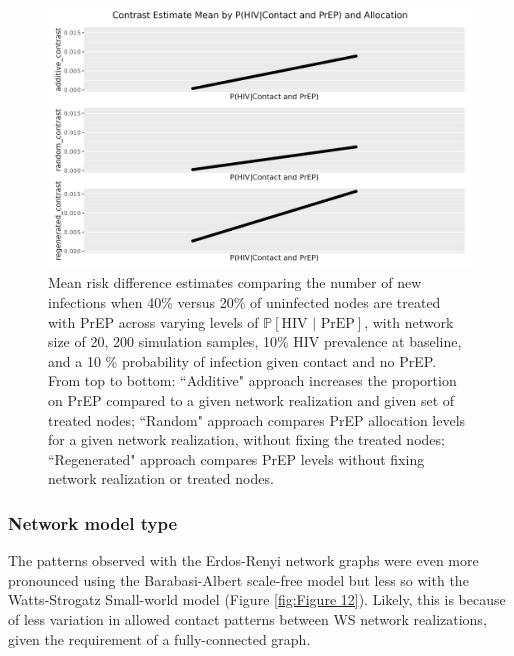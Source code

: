 \documentclass{article}
\theoremstyle{definition}
\begin{document}
\begin{figure}[H]
    \centering
    \includegraphics[width=\linewidth]{Corrected Figures/p2 Mean plots.png}
    \caption{
    Mean risk difference estimates comparing the number of new infections when 40\% versus 20\% of uninfected nodes are treated with PrEP across varying levels of  $\mathbb{P}\left[\text{HIV } \vert \text{ PrEP}\right]$, with network size of 20,  200 simulation samples,  10\% HIV prevalence at baseline, and a 10 \% probability of infection given contact and no PrEP.
     From top to bottom: ``Additive" approach increases the proportion on PrEP compared to a given network realization and given set of treated nodes; ``Random" approach compares PrEP allocation levels for a given network realization, without fixing the treated nodes; ``Regenerated" approach compares PrEP levels without fixing network realization or treated nodes.}
    \label{fig:Figure 11}

\end{figure}

\subsubsection{Network model type}
The patterns observed with the Erdos-Renyi network graphs were even more pronounced using the Barabasi-Albert scale-free model  but less so with the Watts-Strogatz Small-world model (Figure \ref{fig:Figure 12}). Likely, this is because of less variation in allowed contact patterns between WS network realizations, given the requirement of a fully-connected graph. 
\end{document}

